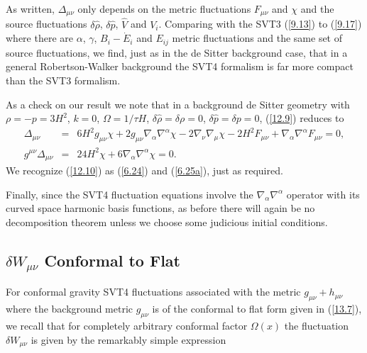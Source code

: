 %
As written, $\Delta_{\mu\nu}$ only depends on the metric fluctuations $F_{\mu\nu}$ and $\chi$  and  the source fluctuations $\delta \hat{\rho}$,  $\delta \hat{p}$, $\hat{V}$ and $V_i$. Comparing with the SVT3 (\ref{9.13}) to (\ref{9.17})  where there are $\alpha$, $\gamma$, $B_i-\dot{E}_i$ and $E_{ij}$ metric fluctuations and the same set of source fluctuations, we find, just as in the de Sitter background case, that  in a general Robertson-Walker background the SVT4 formalism is far more compact than the SVT3 formalism. 

As a check on our result we note that in a background de Sitter geometry with $\rho=-p=3H^2$, $k=0$, $\Omega=1/\tau H$, $\delta \hat{\rho}=\delta \rho=0$,  $\delta \hat{p}=\delta p=0$, (\ref{12.9}) reduces to 
%
\begin{eqnarray}
\Delta_{\mu\nu}&=& 6 H^2 g_{\mu \nu } \chi + 2 g_{\mu \nu } \nabla_{\alpha }\nabla^{\alpha }\chi - 2 \nabla_{\nu }\nabla_{\mu }\chi -2 H^2 F_{\mu \nu } + \nabla_{\alpha }\nabla^{\alpha }F_{\mu \nu }=0,
\nonumber\\ 
g^{\mu\nu}\Delta_{\mu\nu}&=& 24 H^2 \chi + 6 \nabla_{\alpha }\nabla^{\alpha }\chi=0. 
\label{12.10}
\end{eqnarray}
%
We recognize (\ref{12.10}) as (\ref{6.24}) and (\ref{6.25a}), just as required.

Finally, since the SVT4 fluctuation equations involve the $\nabla_{\alpha }\nabla^{\alpha }$ operator with its curved space harmonic basis functions, as before there will again be no decomposition theorem unless we choose some judicious initial conditions.


\subsection{$\delta W_{\mu\nu}$ Conformal to Flat}
\label{ss:deltaw_conformal_flat_svt4}
For conformal gravity SVT4 fluctuations associated with the metric $g_{\mu\nu}+h_{\mu\nu}$ where the background metric $g_{\mu\nu}$ is of the conformal to flat form given in (\ref{13.7}), we recall that for completely arbitrary conformal factor $\Omega(x)$ the fluctuation $\delta W_{\mu\nu}$ is given by the remarkably simple expression  \cite{amarasinghe_2019}


